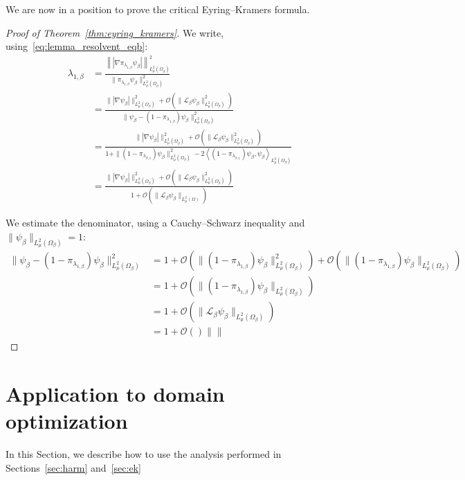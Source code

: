 \documentclass[10pt]{article}
\newcommand{\cL}{\mathcal{L}}
\newcommand{\1}{\mathbbm 1}
\renewcommand{\O}{\mathcal{O}}
\begin{document}
        We are now in a position to prove the critical Eyring--Kramers formula.
        \begin{proof}[Proof of Theorem~\ref{thm:eyring_kramers}]
            We write, using~\eqref{eq:lemma_resolvent_eqb}:
            \begin{align*}
                \lambda_{1,\beta} &= \frac{\left\||\nabla \pi_{\lambda_{1,\beta}}\psi_\beta|\right\|^2_{L^2_\mu(\Omega_\beta)} }{\|\pi_{\lambda_{1,\beta}}\psi_\beta\|^2_{L^2_\mu(\Omega_\beta)}}\\
                &=\frac{\||\nabla \psi_\beta|\|^2_{L_\mu^2(\Omega_\beta)}+\O(\|\cL_\beta \psi_\beta\|^2_{L^2_\mu(\Omega_\beta)})}{\|\psi_\beta-(1-\pi_{\lambda_{1,\beta}})\psi_\beta\|^2_{L^2_\mu(\Omega_\beta)}}\\
                &=\frac{\||\nabla \psi_\beta|\|^2_{L_\mu^2(\Omega_\beta)}+\O(\|\cL_\beta \psi_\beta\|^2_{L^2_\mu(\Omega_\beta)})}{1+\|(1-\pi_{\lambda_{\beta,1}})\psi_\beta\|^2_{L^2_\mu(\Omega_\beta)} - 2\left\langle (1-\pi_{\lambda_{\beta,1}})\psi_\beta,\psi_\beta\right\rangle_{L^2_\mu(\Omega_\beta)}}\\
                &=\frac{\||\nabla \psi_\beta|\|^2_{L_\mu^2(\Omega_\beta)}+\O(\|\cL_\beta \psi_\beta\|^2_{L^2_\mu(\Omega_\beta)})}{1+\O(\|\cL_\beta \psi_\beta\|_{L^2_\mu(\Omega)})}
            \end{align*}

            We estimate the denominator, using a Cauchy--Schwarz inequality and~$\|\psi_\beta\|_{L^2_\mu(\Omega_\beta)}=1$:
            \[
            \begin{aligned}    
            \|\psi_\beta-(1-\pi_{\lambda_{1,\beta}})\psi_\beta\|^2_{L^2_\mu(\Omega_\beta)} &= 1 + \O(\|(1-\pi_{\lambda_{1,\beta}})\psi_\beta\|^2_{L^2_\mu(\Omega_\beta)}) + \O(\|(1-\pi_{\lambda_{1,\beta}})\psi_\beta\|_{L^2_\mu(\Omega_\beta)})\\
            &= 1 + \O(\|(1-\pi_{\lambda_{1,\beta}})\psi_\beta\|_{L^2_\mu(\Omega_\beta)})\\
            &= 1 + \O(\|\cL_\beta \psi_\beta\|_{L^2_\mu(\Omega_\beta)})\\
            &= 1 + \O()\| \|
            \end{aligned}
        \]
        \end{proof}

        \section{Application to domain optimization}
        \label{sec:parrep}
        In this Section, we describe how to use the analysis performed in Sections~\ref{sec:harm} and~\ref{sec:ek}
\end{document}
